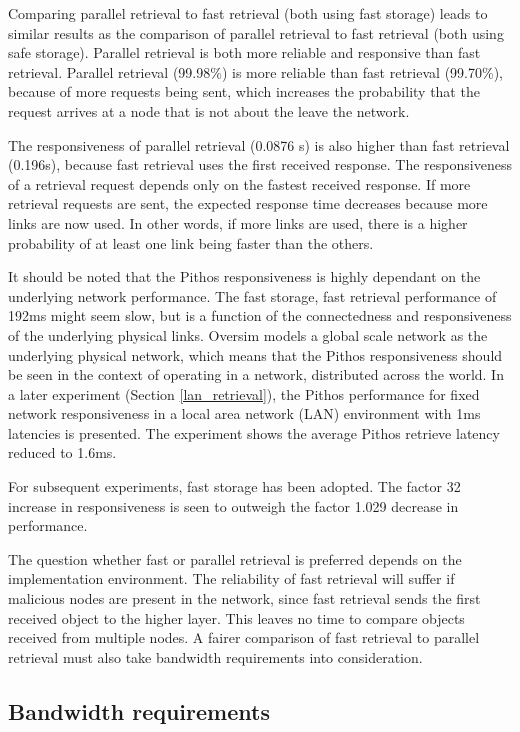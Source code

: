 Comparing parallel retrieval to fast retrieval (both using fast storage) leads to similar results as the comparison of parallel retrieval to fast retrieval (both using safe storage). Parallel retrieval is both more reliable and responsive than fast retrieval. Parallel retrieval (99.98\%) is more reliable than fast retrieval (99.70\%), because of more requests being sent, which increases the probability that the request arrives at a node that is not about the leave the network.

The responsiveness of parallel retrieval (0.0876 s) is also higher than fast retrieval (0.196s), because fast retrieval uses the first received response. The responsiveness of a retrieval request depends only on the fastest received response. If more retrieval requests are sent, the expected response time decreases because more links are now used. In other words, if more links are used, there is a higher probability of at least one link being faster than the others.

It should be noted that the Pithos responsiveness is highly dependant on the underlying network performance. The fast storage, fast retrieval performance of 192ms might seem slow, but is a function of the connectedness and responsiveness of the underlying physical links. Oversim models a global scale network as the underlying physical network, which means that the Pithos responsiveness should be seen in the context of operating in a network, distributed across the world. In a later experiment (Section \ref{lan_retrieval}), the Pithos performance for fixed network responsiveness in a local area network (LAN) environment with 1ms latencies is presented. The experiment shows the average Pithos retrieve latency reduced to 1.6ms.

For subsequent experiments, fast storage has been adopted. The factor 32 increase in responsiveness is seen to outweigh the factor 1.029 decrease in performance.

The question whether fast or parallel retrieval is preferred depends on the implementation environment. The reliability of fast retrieval will suffer if malicious nodes are present in the network, since fast retrieval sends the first received object to the higher layer. This leaves no time to compare objects received from multiple nodes. A fairer comparison of fast retrieval to parallel retrieval must also take bandwidth requirements into consideration.

\subsection{Bandwidth requirements}
\label{bandwidth_requirements}

